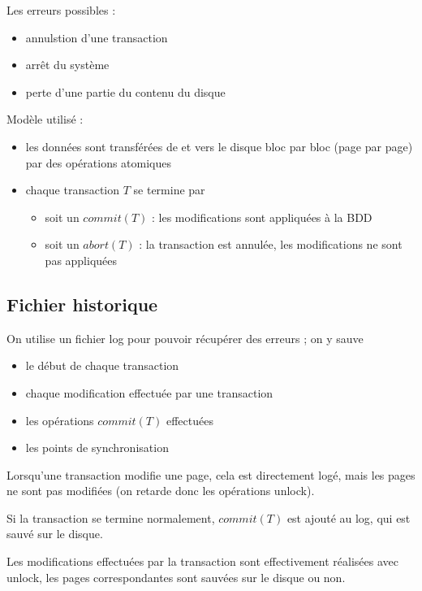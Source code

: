 		Les erreurs possibles :
		
		\begin{itemize}
			\item annulstion d'une transaction
			\item arrêt du système
			\item perte d'une partie du contenu du disque
		\end{itemize}
		
		\pagebreak
		Modèle utilisé :
		
		\begin{itemize}
			\item les données sont transférées de et vers le disque bloc par bloc (page par page) par des opérations atomiques
			\item chaque transaction $T$ se termine par
			
			\begin{itemize}
				\item soit un $commit(T)$ : les modifications sont appliquées à la BDD
				\item soit un $abort(T)$ : la transaction est annulée, les modifications ne sont pas appliquées
			\end{itemize}
		\end{itemize}
		
		\subsection{Fichier historique}
		
		On utilise un fichier log pour pouvoir récupérer des erreurs ; on y sauve
		
		\begin{itemize}
			\item le début de chaque transaction
			\item chaque modification effectuée par une transaction
			\item les opérations $commit(T)$ effectuées
			\item les points de synchronisation
		\end{itemize}
		
		Lorsqu'une transaction modifie une page, cela est directement logé, mais les pages ne sont pas modifiées (on retarde donc les opérations unlock).
		
		Si la transaction se termine normalement, $commit(T)$ est ajouté au log, qui est sauvé sur le disque.
		
		Les modifications effectuées par la transaction sont effectivement réalisées avec unlock, les pages correspondantes sont sauvées sur le disque ou non.
		
